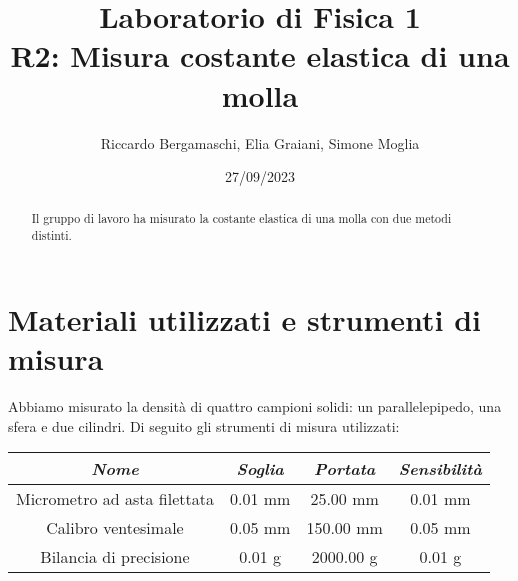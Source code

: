 \documentclass{article}
\title{
    Laboratorio di Fisica 1\\
    R2: Misura costante elastica di una molla
}
\author{Riccardo Bergamaschi, Elia Graiani, Simone Moglia}
\date{27/09/2023}
\begin{document}
\maketitle

\begin{abstract}
    Il gruppo di lavoro ha misurato la costante elastica di una molla con due metodi distinti.
\end{abstract}

\section{Materiali utilizzati e strumenti di misura}
Abbiamo misurato la densità di quattro campioni solidi:
un parallelepipedo, una sfera e due cilindri.
Di seguito gli strumenti di misura utilizzati:

\begin{center}
    \begin{tabular}{ |c|c|c|c| }
        \hline
        \emph{Nome} & \emph{Soglia} & \emph{Portata} & \emph{Sensibilità} \\
        \hline
        Micrometro ad asta filettata & 0.01 mm & 25.00 mm & 0.01 mm \\
        Calibro ventesimale & 0.05 mm & 150.00 mm & 0.05 mm \\
        Bilancia di precisione & 0.01 g & 2000.00 g & 0.01 g \\
        \hline
    \end{tabular}
\end{center}

\end{document}
